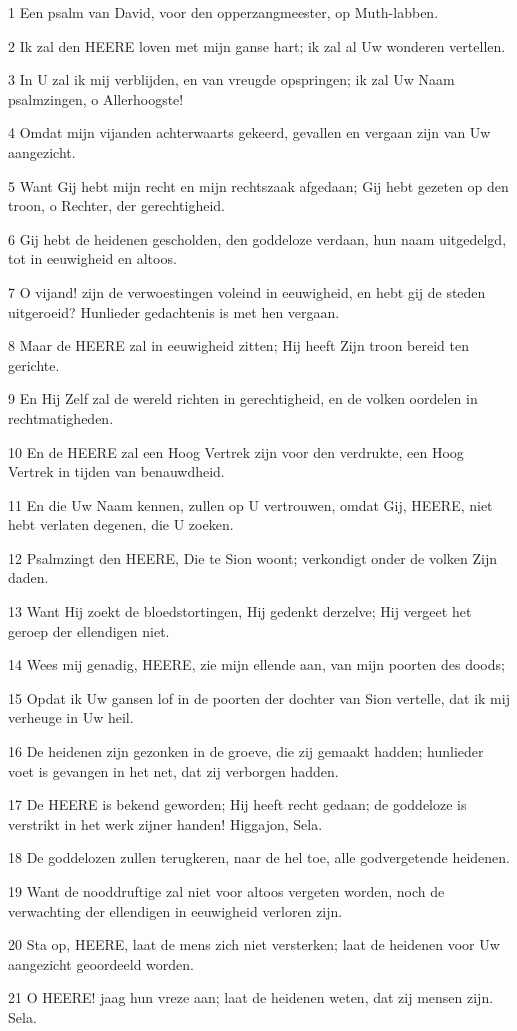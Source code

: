 \par 1 Een psalm van David, voor den opperzangmeester, op Muth-labben.
\par 2 Ik zal den HEERE loven met mijn ganse hart; ik zal al Uw wonderen vertellen.
\par 3 In U zal ik mij verblijden, en van vreugde opspringen; ik zal Uw Naam psalmzingen, o Allerhoogste!
\par 4 Omdat mijn vijanden achterwaarts gekeerd, gevallen en vergaan zijn van Uw aangezicht.
\par 5 Want Gij hebt mijn recht en mijn rechtszaak afgedaan; Gij hebt gezeten op den troon, o Rechter, der gerechtigheid.
\par 6 Gij hebt de heidenen gescholden, den goddeloze verdaan, hun naam uitgedelgd, tot in eeuwigheid en altoos.
\par 7 O vijand! zijn de verwoestingen voleind in eeuwigheid, en hebt gij de steden uitgeroeid? Hunlieder gedachtenis is met hen vergaan.
\par 8 Maar de HEERE zal in eeuwigheid zitten; Hij heeft Zijn troon bereid ten gerichte.
\par 9 En Hij Zelf zal de wereld richten in gerechtigheid, en de volken oordelen in rechtmatigheden.
\par 10 En de HEERE zal een Hoog Vertrek zijn voor den verdrukte, een Hoog Vertrek in tijden van benauwdheid.
\par 11 En die Uw Naam kennen, zullen op U vertrouwen, omdat Gij, HEERE, niet hebt verlaten degenen, die U zoeken.
\par 12 Psalmzingt den HEERE, Die te Sion woont; verkondigt onder de volken Zijn daden.
\par 13 Want Hij zoekt de bloedstortingen, Hij gedenkt derzelve; Hij vergeet het geroep der ellendigen niet.
\par 14 Wees mij genadig, HEERE, zie mijn ellende aan, van mijn poorten des doods;
\par 15 Opdat ik Uw gansen lof in de poorten der dochter van Sion vertelle, dat ik mij verheuge in Uw heil.
\par 16 De heidenen zijn gezonken in de groeve, die zij gemaakt hadden; hunlieder voet is gevangen in het net, dat zij verborgen hadden.
\par 17 De HEERE is bekend geworden; Hij heeft recht gedaan; de goddeloze is verstrikt in het werk zijner handen! Higgajon, Sela.
\par 18 De goddelozen zullen terugkeren, naar de hel toe, alle godvergetende heidenen.
\par 19 Want de nooddruftige zal niet voor altoos vergeten worden, noch de verwachting der ellendigen in eeuwigheid verloren zijn.
\par 20 Sta op, HEERE, laat de mens zich niet versterken; laat de heidenen voor Uw aangezicht geoordeeld worden.
\par 21 O HEERE! jaag hun vreze aan; laat de heidenen weten, dat zij mensen zijn. Sela.

